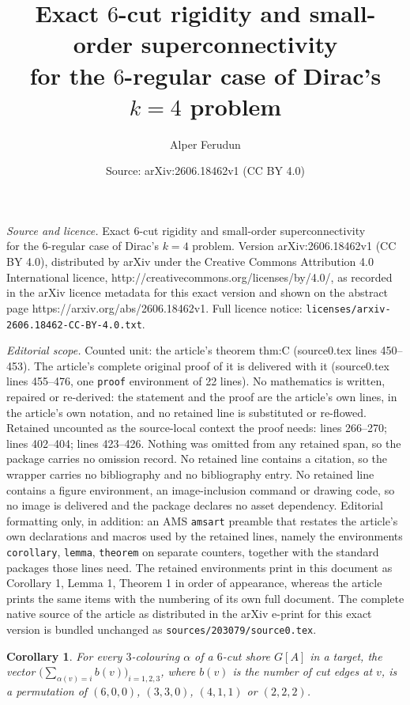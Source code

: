 \documentclass[10pt,a4paper]{amsart}
\title{Exact $6$-cut rigidity and small-order superconnectivity\\ for the $6$-regular case of Dirac's $k=4$ problem}
\author{Alper Ferudun}
\date{Source: arXiv:2606.18462v1 (CC BY 4.0)}
\newtheorem{corollary}{Corollary}
\begin{document}
\maketitle

\noindent\emph{Source and licence.} Exact $6$-cut rigidity and small-order superconnectivity\\ for the $6$-regular case of Dirac's $k=4$ problem. Version arXiv:2606.18462v1 (CC BY 4.0), distributed by arXiv under the Creative Commons Attribution 4.0 International licence, http://creativecommons.org/licenses/by/4.0/, as recorded in the arXiv licence metadata for this exact version and shown on the abstract page https://arxiv.org/abs/2606.18462v1. Full licence notice: \texttt{licenses/arxiv-2606.18462-CC-BY-4.0.txt}.\par\smallskip

\noindent\textit{Editorial scope.} Counted unit: the article's theorem thm:C (source0.tex lines 450--453). The article's complete original proof of it is delivered with it (source0.tex lines 455--476, one \texttt{proof} environment of 22 lines). No mathematics is written, repaired or re-derived: the statement and the proof are the article's own lines, in the article's own notation, and no retained line is substituted or re-flowed.  Retained uncounted as the source-local context the proof needs: lines 266--270; lines 402--404; lines 423--426.  Nothing was omitted from any retained span, so the package carries no omission record.  No retained line contains a citation, so the wrapper carries no bibliography and no bibliography entry.  No retained line contains a figure environment, an image-inclusion command or drawing code, so no image is delivered and the package declares no asset dependency.  Editorial formatting only, in addition: an AMS \texttt{amsart} preamble that restates the article's own declarations and macros used by the retained lines, namely the environments \texttt{corollary}, \texttt{lemma}, \texttt{theorem} on separate counters, together with the standard packages those lines need.  The retained environments print in this document as Corollary 1, Lemma 1, Theorem 1 in order of appearance, whereas the article prints the same items with the numbering of its own full document.  The complete native source of the article as distributed in the arXiv e-print for this exact version is bundled unchanged as \texttt{sources/203079/source0.tex}.
\begin{corollary}\label{cor:rowsum}
For every $3$-colouring $\alpha$ of a $6$-cut shore $G[A]$ in a target, the vector
$\bigl(\sum_{\alpha(v)=i} b(v)\bigr)_{i=1,2,3}$, where $b(v)$ is the number of cut
edges at $v$, is a permutation of $(6,0,0)$, $(3,3,0)$, $(4,1,1)$ or $(2,2,2)$.
\end{corollary}
\end{document}
